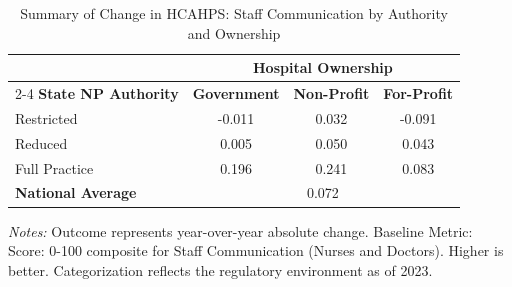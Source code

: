 \begin{table}[htbp]
    \centering
    \caption{Summary of Change in HCAHPS: Staff Communication by Authority and Ownership}
    \label{tab:d_hcahps_grp1_own}
    \vspace{0.2cm}
    \begin{tabular}{lccc}
        \toprule
        & \multicolumn{3}{c}{\textbf{Hospital Ownership}} \\
        \cmidrule(lr){2-4}
        \textbf{State NP Authority} & \textbf{Government} & \textbf{Non-Profit} & \textbf{For-Profit} \\
        \midrule
        Restricted & -0.011 & 0.032 & -0.091 \\
        Reduced & 0.005 & 0.050 & 0.043 \\
        Full Practice & 0.196 & 0.241 & 0.083 \\
        \midrule
        \textbf{National Average} & \multicolumn{3}{c}{0.072} \\
        \bottomrule
    \end{tabular}
    \vspace{0.1cm}
    \begin{minipage}{0.85\textwidth}
        \footnotesize \textit{Notes:} Outcome represents year-over-year absolute change. Baseline Metric: Score: 0-100 composite for Staff Communication (Nurses and Doctors). Higher is better. Categorization reflects the regulatory environment as of 2023.
    \end{minipage}
\end{table}